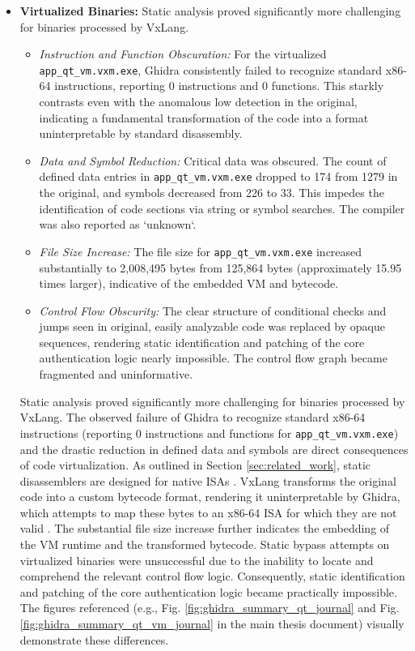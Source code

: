 \begin{itemize}
	\item \textbf{Virtualized Binaries:} Static analysis proved significantly more challenging for binaries processed by VxLang.
	      \begin{itemize}
		      \item \textit{Instruction and Function Obscuration:} For the virtualized \texttt{app\_qt\_vm.vxm.exe}, Ghidra consistently failed to recognize standard x86-64 instructions, reporting 0 instructions and 0 functions. This starkly contrasts even with the anomalous low detection in the original, indicating a fundamental transformation of the code into a format uninterpretable by standard disassembly.
		      \item \textit{Data and Symbol Reduction:} Critical data was obscured. The count of defined data entries in \texttt{app\_qt\_vm.vxm.exe} dropped to 174 from 1279 in the original, and symbols decreased from 226 to 33. This impedes the identification of code sections via string or symbol searches. The compiler was also reported as `unknown`.
		      \item \textit{File Size Increase:} The file size for \texttt{app\_qt\_vm.vxm.exe} increased substantially to 2,008,495 bytes from 125,864 bytes (approximately 15.95 times larger), indicative of the embedded VM and bytecode.
		      \item \textit{Control Flow Obscurity:} The clear structure of conditional checks and jumps seen in original, easily analyzable code was replaced by opaque sequences, rendering static identification and patching of the core authentication logic nearly impossible. The control flow graph became fragmented and uninformative.
	      \end{itemize}
Static analysis proved significantly more challenging for binaries processed by VxLang. The observed failure of Ghidra to recognize standard x86-64 instructions (reporting 0 instructions and functions for \texttt{app\_qt\_vm.vxm.exe}) and the drastic reduction in defined data and symbols are direct consequences of code virtualization. As outlined in Section \ref{sec:related_work}, static disassemblers are designed for native ISAs \cite{Sikorski2012, Eilam2011}. VxLang transforms the original code into a custom bytecode format, rendering it uninterpretable by Ghidra, which attempts to map these bytes to an x86-64 ISA for which they are not valid \cite{Ko2007}. The substantial file size increase further indicates the embedding of the VM runtime and the transformed bytecode.
	      Static bypass attempts on virtualized binaries were unsuccessful due to the inability to locate and comprehend the relevant control flow logic. Consequently, static identification and patching of the core authentication logic became practically impossible. The figures referenced (e.g., Fig. \ref{fig:ghidra_summary_qt_journal} and Fig. \ref{fig:ghidra_summary_qt_vm_journal} in the main thesis document) visually demonstrate these differences.
\end{itemize}


